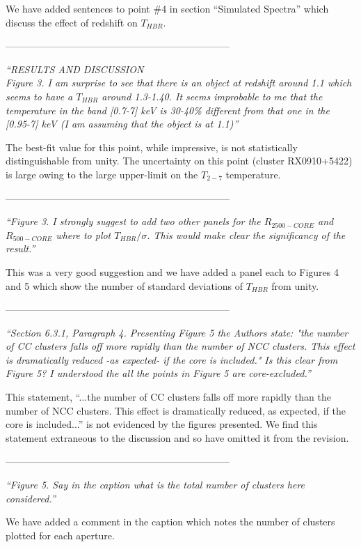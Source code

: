 \documentclass[11pt]{article}
\begin{document}
We have added sentences to point \#4 in section ``Simulated Spectra''
which discuss the effect of redshift on $T_{HBR}$.

---------------------------------------------------------------------

\textit{
``{RESULTS AND DISCUSSION}\\
Figure 3. I am surprise to see that there is an object at redshift around
1.1 which seems to have a $T_{HBR}$ around 1.3-1.40. It seems
improbable to me that the temperature in the band [0.7-7] keV is
30-40\% different from that one in the [0.95-7] keV (I am assuming
that the object is at 1.1)''
}

The best-fit value for this point, while impressive, is not
statistically distinguishable from unity. The uncertainty on this
point (cluster RX0910+5422) is large owing to the large upper-limit on
the $T_{2-7}$ temperature.

---------------------------------------------------------------------

\textit{
``Figure 3. I strongly suggest to add two other panels for the
$R_{2500-CORE}$ and $R_{500-CORE}$ where to plot
$T_{HBR}/\sigma$. This would make clear the significancy of the
result.''
}

This was a very good suggestion and we have added a panel each to
Figures 4 and 5 which show the number of standard deviations of
$T_{HBR}$ from unity.

---------------------------------------------------------------------

\textit{
``Section 6.3.1, Paragraph 4. Presenting Figure 5 the Authors state:
"the number of CC clusters falls off more rapidly than the number of
NCC clusters. This effect is dramatically reduced -as expected- if the
core is included." Is this clear from Figure 5? I understood the all
the points in Figure 5 are core-excluded.''
}

This statement, ``...the number of CC clusters falls off more rapidly
than the number of NCC clusters. This effect is dramatically reduced,
as expected, if the core is included...'' is not evidenced by the
figures presented. We find this statement extraneous to the discussion
and so have omitted it from the revision.

---------------------------------------------------------------------

\textit{
``Figure 5. Say in the caption what is the total number of clusters
here considered.''
}

We have added a comment in the caption which notes the number of
clusters plotted for each aperture.
\end{document}
